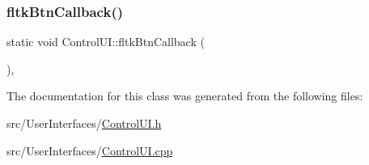 \mbox{\label{class_control_u_i_ab72cd93a7844ff76187ddf77432ddafb}} 
\subsubsection{\texorpdfstring{fltk\+Btn\+Callback()}{fltkBtnCallback()}}
{\footnotesize\ttfamily static void Control\+U\+I\+::fltk\+Btn\+Callback (\begin{DoxyParamCaption}{ }\end{DoxyParamCaption})\hspace{0.3cm}{\ttfamily [static]}, {\ttfamily [private]}}



The documentation for this class was generated from the following files\+:\begin{DoxyCompactItemize}
\item 
src/\+User\+Interfaces/\hyperlink{_control_u_i_8h}{Control\+U\+I.\+h}\item 
src/\+User\+Interfaces/\hyperlink{_control_u_i_8cpp}{Control\+U\+I.\+cpp}\end{DoxyCompactItemize}
